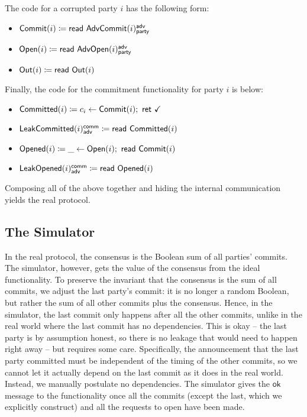 The code for a corrupted party $i$ has the following form:
\begin{itemize}
\item {\color{blue} $\mathsf{Commit}(i) \coloneqq \mathsf{read} \ \mathsf{AdvCommit}(i)^{\mathsf{adv}}_{\mathsf{party}}$}
\item {\color{teal} $\mathsf{Open}(i) \coloneqq \mathsf{read} \ \mathsf{AdvOpen}(i)^{\mathsf{adv}}_{\mathsf{party}}$}
\item $\mathsf{Out}(i) \coloneqq \mathsf{read} \ \mathsf{Out}(i)$
\end{itemize}
Finally, the code for the commitment functionality for party $i$ is below:
\begin{itemize}
\item {\color{magenta} $\mathsf{Committed}(i) \coloneqq c_i \leftarrow \mathsf{Commit}(i); \ \mathsf{ret} \ \checkmark$}
\item {\color{magenta} $\mathsf{LeakCommitted}(i)^{\mathsf{comm}}_{\mathsf{adv}} \coloneqq \mathsf{read} \ \mathsf{Committed}(i)$}
\item {\color{red} $\mathsf{Opened}(i) \coloneqq \_ \leftarrow \mathsf{Open}(i); \ \mathsf{read} \ \mathsf{Commit}(i)$}
\item {\color{red} $\mathsf{LeakOpened}(i)^{\mathsf{comm}}_{\mathsf{adv}} \coloneqq \mathsf{read} \ \mathsf{Opened}(i)$}
\end{itemize}
Composing all of the above together and hiding the internal communication yields the real protocol.

\subsection{The Simulator}
In the real protocol, the consensus is the Boolean sum of all parties' commits. The simulator, however, gets the value of the consensus from the ideal functionality. To preserve the invariant that the consensus is the sum of all commits, we adjust the last party's commit: it is no longer a random Boolean, but rather the sum of all other commits plus the consensus. Hence, in the simulator, the last commit only happens after all the other commits, unlike in the real world where the last commit has no dependencies. This is okay -- the last party is by assumption honest, so there is no leakage that would need to happen right away -- but requires some care. Specifically, the announcement that the last party committed must be independent of the timing of the other commits, so we cannot let it actually depend on the last commit as it does in the real world. Instead, we manually postulate no dependencies. The simulator gives the $\mathsf{ok}$ message to the functionality once all the commits (except the last, which we explicitly construct) and all the requests to open have been made.

